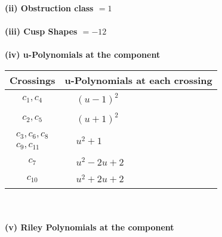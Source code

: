 \documentclass[1p]{elsarticle_modified}
\theoremstyle{definition}
\begin{document}
\flushleft \textbf{(ii) Obstruction class $= 1$}\\~\\
\flushleft \textbf{(iii) Cusp Shapes $= -12$}\\~\\
\newpage\renewcommand{\arraystretch}{1}
\flushleft \textbf{(iv) u-Polynomials at the component}\newline \\
\begin{tabular}{m{50pt}|m{274pt}}
Crossings & \hspace{64pt}u-Polynomials at each crossing \\
\hline $$\begin{aligned}c_{1},c_{4}\end{aligned}$$&$\begin{aligned}
&(u-1)^2
\end{aligned}$\\
\hline $$\begin{aligned}c_{2},c_{5}\end{aligned}$$&$\begin{aligned}
&(u+1)^2
\end{aligned}$\\
\hline $$\begin{aligned}c_{3},c_{6},c_{8}\\c_{9},c_{11}\end{aligned}$$&$\begin{aligned}
&u^2+1
\end{aligned}$\\
\hline $$\begin{aligned}c_{7}\end{aligned}$$&$\begin{aligned}
&u^2-2 u+2
\end{aligned}$\\
\hline $$\begin{aligned}c_{10}\end{aligned}$$&$\begin{aligned}
&u^2+2 u+2
\end{aligned}$\\
\hline
\end{tabular}\\~\\
\newpage\renewcommand{\arraystretch}{1}
\flushleft \textbf{(v) Riley Polynomials at the component}\newline \\
\end{document}
